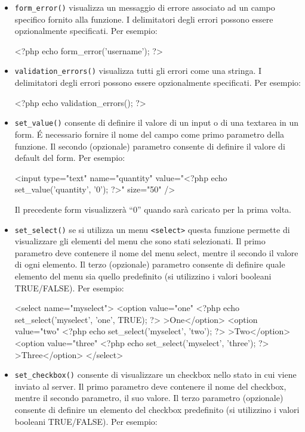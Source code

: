 \begin{itemize}
\item \verb|form_error()| visualizza un messaggio di errore associato ad un campo specifico fornito alla funzione. I delimitatori degli errori possono essere opzionalmente specificati. Per esempio:

\begin{code}
<?php echo form_error('username'); ?>
\end{code}

\item \verb|validation_errors()| visualizza tutti gli errori come una stringa. I delimitatori degli errori possono essere opzionalmente specificati. Per esempio:

\begin{code}
<?php echo validation_errors(); ?>
\end{code}

\item \verb|set_value()| consente di definire il valore di un input o di una textarea in un form. \'E necessario fornire il nome del campo come primo parametro della funzione. Il secondo (opzionale) parametro consente di definire il valore di default del form. Per esempio:

\begin{code}
<input type="text" name="quantity" value="<?php echo set_value('quantity', '0'); ?>" size="50" />
\end{code}

Il precedente form visualizzerà ``0'' quando sarà caricato per la prima volta.

\item \verb|set_select()| se si utilizza un menu \verb|<select>| questa funzione permette di visualizzare gli elementi del menu che sono stati selezionati. Il primo parametro deve contenere il nome del menu select, mentre il secondo il valore di ogni elemento. Il terzo (opzionale) parametro consente di definire quale elemento del menu sia quello predefinito (si utilizzino i valori booleani TRUE/FALSE). Per esempio:

\begin{code}
<select name="myselect">
<option value="one" <?php echo set_select('myselect', 'one', TRUE); ?> >One</option>
<option value="two" <?php echo set_select('myselect', 'two'); ?> >Two</option>
<option value="three" <?php echo set_select('myselect', 'three'); ?> >Three</option>
</select>
\end{code}

\item \verb|set_checkbox()| consente di visualizzare un checkbox nello stato in cui viene inviato al server. Il primo parametro deve contenere il nome del checkbox, mentre il secondo parametro, il suo valore. Il terzo parametro (opzionale) consente di definire un elemento del checkbox predefinito (si utilizzino i valori booleani TRUE/FALSE). Per esempio:


\end{itemize}
